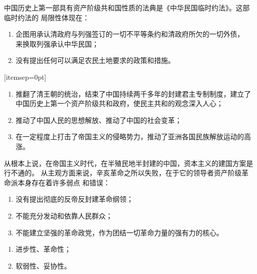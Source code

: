 \documentclass[10pt, UTF8]{book} %
\begin{document}
\begin{mdframed}[frametitle={中华民国的建立与《中华民国临时约法》的局限性}]
    中国历史上第一部具有资产阶级共和国性质的法典是《中华民国临时约法》。这部临时约法的
    局限性体现在：
    \begin{enumerate}[itemsep=0pt]
        \item 企图用承认清政府与列强签订的一切不平等条约和清政府所欠的一切外债，
        来换取列强承认中华民国；
        \item 没有提出任何可以满足农民土地要求的政策和措施。
    \end{enumerate}[itemsep=0pt]
\end{mdframed}

\begin{mdframed}[frametitle={辛亥革命的历史意义}]
\begin{enumerate}[itemsep=0pt]
    \item 推翻了清王朝的统治，结束了中国持续两千多年的封建君主专制制度，建立了中国历史上第一个资产阶级共和政府，使民主共和的观念深入人心；
    \item 推动了中国人民的思想解放、推动了中国的社会变革；
    \item 在一定程度上打击了帝国主义的侵略势力，推动了亚洲各国民族解放运动的高涨。
\end{enumerate}
\end{mdframed}

\begin{mdframed}[frametitle={辛亥革命失败的原因和教训}]
    从根本上说，在帝国主义时代，在半殖民地半封建的中国，资本主义的建国方案是行不通的。
    从主观方面来说，辛亥革命之所以失败，在于它的领导者资产阶级革命派本身存在着许多弱点
    和错误：
\begin{enumerate}[itemsep=0pt]
    \item 没有提出彻底的反帝反封建革命纲领；
    \item 不能充分发动和依靠人民群众；
    \item 不能建立坚强的革命政党，作为团结一切革命力量的强有力的核心。
\end{enumerate}
\end{mdframed}

\begin{mdframed}[frametitle={民族资产阶级的两面性}]
    \begin{enumerate}[itemsep=0pt]
            \item 进步性、革命性；
            \item 软弱性、妥协性。
    \end{enumerate}
    \end{mdframed}
\end{document}
